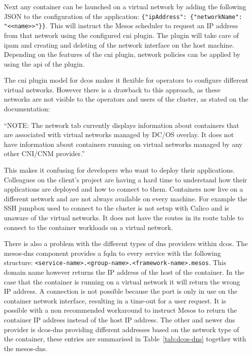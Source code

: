 Next any container can be launched on a virtual network by adding the following JSON to the configuration of the application: \texttt{\{"ipAddress": \{"networkName": "<<name>>"\}\}}. This will instruct the Mesos scheduler to request an IP address from that network using the configured \gls{cni} plugin. The plugin will take care of \gls{ipam} and creating and deleting of the network interface on the host machine. Depending on the features of the \gls{cni} plugin, network policies can be applied by using the \gls{api} of the plugin.

The \gls{cni} plugin model for \gls{dcos} makes it flexible for operators to configure different virtual networks. However there is a drawback to this approach, as these networks are not visible to the operators and users of the cluster, as stated on the documentation\cite{dcos_sdn}:
\begin{displayquote}
    ``NOTE: The network tab currently displays information about containers that are associated with virtual networks managed by DC/OS overlay. It does not have information about containers running on virtual networks managed by any other CNI/CNM provider.'' 
\end{displayquote}
This makes it confusing for developers who want to deploy their applications. Colleagues on the client's project are having a hard time to understand how their applications are deployed and how to connect to them. Containers now live on a different network and are not always available on every machine. For example the SSH jumpbox used to connect to the cluster is not setup with Calico and is unaware of the virtual networks. It does not have the routes in its route table to connect to the container workloads on a virtual network. 

There is also a problem with the different types of \gls{dns} providers within \gls{dcos}. The mesos-dns component provides a \gls{fqdn} to every service with the following structure: \texttt{<service-name>.<group-name>.<framework-name>.mesos}. This domain name however returns the IP address of the host of the container. In the case that the container is running on a virtual network it will return the wrong IP address. A connection is not possible because the port is only in use on the container network interface, resulting in a time-out for a user request. It is possible with a non recommended workaround to instruct Mesos to return the container IP address instead of the host IP address\cite{mesos_workaround}. The other and newer \gls{dns} provider is dcos-dns providing different addresses based on the network type of the container, these entries are summarised in Table~\ref{tab:dcos-dns} together with the mesos-dns.


